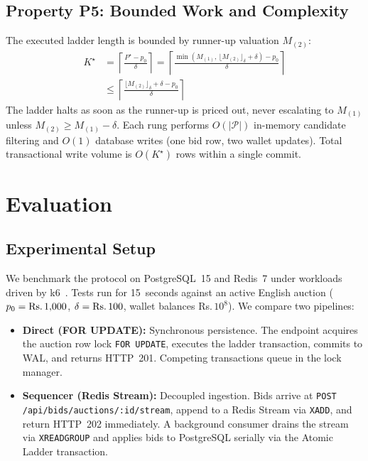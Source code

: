 \documentclass[conference]{IEEEtran}
\begin{document}
\subsection{Property P5: Bounded Work and Complexity}
The executed ladder length is bounded by runner-up valuation $M_{(2)}$:
\begin{equation}
\begin{split}
  K^\star &= \left\lceil \frac{P^\star - p_0}{\delta} \right\rceil = \left\lceil \frac{\min(M_{(1)},\, \lfloor M_{(2)} \rfloor_\delta + \delta) - p_0}{\delta} \right\rceil \\
  &\leq \left\lceil \frac{\lfloor M_{(2)} \rfloor_\delta + \delta - p_0}{\delta} \right\rceil
\end{split}
\label{eq:bound}
\end{equation}
The ladder halts as soon as the runner-up is priced out, never escalating to $M_{(1)}$
unless $M_{(2)} \geq M_{(1)} - \delta$. Each rung performs $O(|\mathcal{P}|)$ in-memory
candidate filtering and $O(1)$ database writes (one bid row, two wallet updates).
Total transactional write volume is $O(K^\star)$ rows within a single commit.

\section{Evaluation}
\label{sec:eval}

\subsection{Experimental Setup}
We benchmark the protocol on PostgreSQL~15 and Redis~7 under workloads driven by k6~\cite{k6}.
Tests run for 15~seconds against an active English auction ($p_0 = \text{Rs.\,}1{,}000$,
$\delta = \text{Rs.\,}100$, wallet balances Rs.\,$10^8$). We compare two pipelines:
\begin{itemize}
  \item \textbf{Direct (FOR UPDATE):} Synchronous persistence. The endpoint acquires the auction
    row lock \texttt{FOR UPDATE}, executes the ladder transaction, commits to WAL, and returns
    HTTP~201. Competing transactions queue in the lock manager.
  \item \textbf{Sequencer (Redis Stream):} Decoupled ingestion. Bids arrive at
    \texttt{POST /api/bids/}\allowbreak\texttt{auctions/:id/stream}, append to a Redis Stream via \texttt{XADD},
    and return HTTP~202 immediately. A background consumer drains the stream via \texttt{XREADGROUP}
    and applies bids to PostgreSQL serially via the Atomic Ladder transaction.
\end{itemize}
\end{document}
